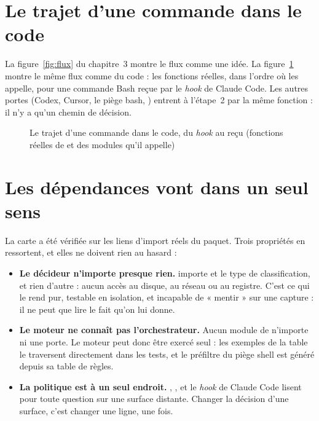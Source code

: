 \section{Le trajet d'une commande dans le code}
La figure~\ref{fig:flux} du chapitre~3 montre le flux comme une idée. La
figure~\ref{fig:trajet} montre le même flux comme du code : les fonctions réelles, dans l'ordre
où  les appelle, pour une commande Bash reçue par le \textit{hook} de
Claude Code. Les autres portes (Codex, Cursor, le piège bash, ) entrent à
l'étape~2 par la même fonction : il n'y a qu'un chemin de décision.

\begin{figure}[htbp]
\centering

\caption{Le trajet d'une commande dans le code, du \textit{hook} au reçu (fonctions réelles de
 et des modules qu'il appelle)}
\label{fig:trajet}
\end{figure}

\section{Les dépendances vont dans un seul sens}
La carte a été vérifiée sur les \nbimports{} liens d'import réels du paquet. Trois propriétés
en ressortent, et elles ne doivent rien au hasard :
\begin{itemize}
  \item \textbf{Le décideur n'importe presque rien.}  importe
     et le type de classification, et rien d'autre : aucun accès au disque,
    au réseau ou au registre. C'est ce qui le rend pur, testable en isolation, et incapable de
    « mentir » sur une capture : il ne peut que lire le fait qu'on lui donne.
  \item \textbf{Le moteur ne connaît pas l'orchestrateur.} Aucun module de 
    n'importe  ni une porte. Le moteur peut donc être exercé seul : les
    \nbexemples{} exemples de la table le traversent directement dans les tests, et le
    préfiltre du piège shell est généré depuis sa table de règles.
  \item \textbf{La politique est à un seul endroit.} ,
    ,  et le \textit{hook} de Claude Code lisent
     pour toute question sur une surface distante. Changer la décision d'une
    surface, c'est changer une ligne, une fois.
\end{itemize}

